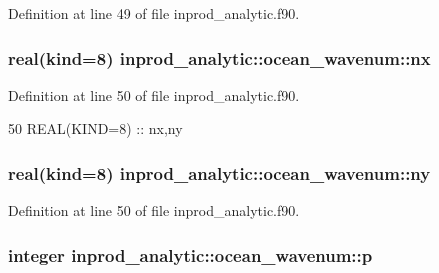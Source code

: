 Definition at line 49 of file inprod\+\_\+analytic.\+f90.

\subsubsection[{\texorpdfstring{nx}{nx}}]{\setlength{\rightskip}{0pt plus 5cm}real(kind=8) inprod\+\_\+analytic\+::ocean\+\_\+wavenum\+::nx\hspace{0.3cm}{\ttfamily [private]}}\hypertarget{structinprod__analytic_1_1ocean__wavenum_a6084ea7c554f942e74779a2be38b7d3d}{}\label{structinprod__analytic_1_1ocean__wavenum_a6084ea7c554f942e74779a2be38b7d3d}


Definition at line 50 of file inprod\+\_\+analytic.\+f90.


\begin{DoxyCode}
50      \textcolor{keywordtype}{REAL(KIND=8)} :: nx,ny
\end{DoxyCode}
\subsubsection[{\texorpdfstring{ny}{ny}}]{\setlength{\rightskip}{0pt plus 5cm}real(kind=8) inprod\+\_\+analytic\+::ocean\+\_\+wavenum\+::ny\hspace{0.3cm}{\ttfamily [private]}}\hypertarget{structinprod__analytic_1_1ocean__wavenum_a0738c305f503d7864a9073c5cea352ab}{}\label{structinprod__analytic_1_1ocean__wavenum_a0738c305f503d7864a9073c5cea352ab}


Definition at line 50 of file inprod\+\_\+analytic.\+f90.

\subsubsection[{\texorpdfstring{p}{p}}]{\setlength{\rightskip}{0pt plus 5cm}integer inprod\+\_\+analytic\+::ocean\+\_\+wavenum\+::p\hspace{0.3cm}{\ttfamily [private]}}\hypertarget{structinprod__analytic_1_1ocean__wavenum_a3170ff1b2a81b58ae81527a964682c06}{}\label{structinprod__analytic_1_1ocean__wavenum_a3170ff1b2a81b58ae81527a964682c06}


